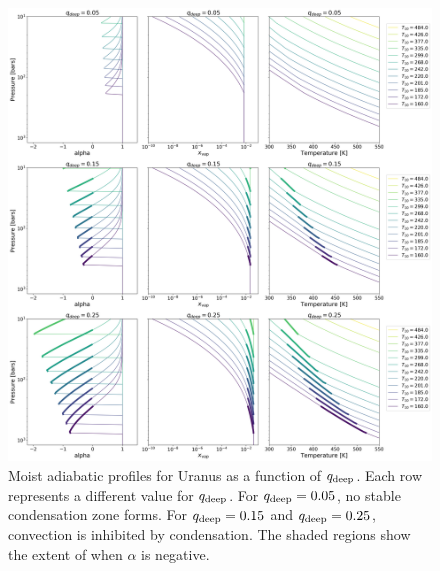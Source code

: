 \documentclass[11pt]{ucscthesisbs}
\begin{document}
\begin{figure}[ht!]{}
 \centerline{
  \includegraphics[scale=0.4]{figures/convection_inhibited_2.png}
 }
\caption[Inhibition of convection on Uranus]
{Moist adiabatic profiles for Uranus as a function of  $q_{\rm deep}$. Each row represents a different value for $q_{\rm deep}$. For $q_{\rm deep} = 0.05$, no stable condensation zone forms. For $q_{\rm deep} = 0.15$ and $q_{\rm deep} = 0.25$, convection is inhibited by condensation. The shaded regions show the extent of when $\alpha$ is negative.}
\label{fig:convection_inhibited}
\end{figure}
\end{document}
